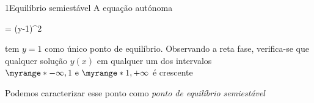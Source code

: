 \documentclass["AM3C-Slides_annotations.tex"]{subfiles}
\begin{document}
\begin{exampleBox}1{Equilíbrio semiestável} %
  A equação autónoma
  \begin{BM}
     = (y-1)^2
  \end{BM}
  tem \(y=1\) como único ponto de equilíbrio. Observando a reta fase, verifica-se que qualquer solução \(y(x)\) em qualquer um dos intervalos \(\myrange*{-\infty,1}\text{ e }\myrange*{1,+\infty}\) é crescente
  \begin{center}
  \end{center}
  Podemos caracterizar esse ponto como \emph{ponto de equilíbrio semiestável}
\end{exampleBox}
\end{document}
